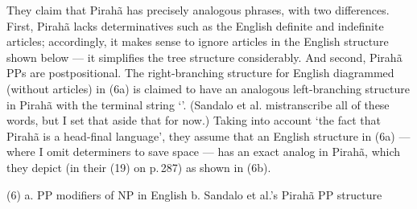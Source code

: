 \documentclass[output=paper,colorlinks,citecolor=brown
]{langscibook}
\begin{document}
They claim that Pirah{\~a} has precisely analogous phrases, with two
differences. First, Pirah{\~a} lacks determinatives such as the English
definite and indefinite articles; accordingly, it makes sense to ignore
articles in the English structure shown below --- it simplifies the tree
structure considerably.  And second, Pirah{\~a} PPs are postpositional.
The right-branching structure for English diagrammed (without articles)
in (6a) is claimed to have an analogous left-branching structure in
Pirah{\~a} with the terminal string `'. (Sandalo et al. mistranscribe all of these
words, but I set that aside that for now.) Taking into account `the
fact that Pirah{\~a} is a head-final language', they assume that an
English structure in (6a) --- where I omit determiners to save space
--- has an exact analog in Pirah{\~a}, which they depict
(in their (19) on p.\,287) as shown in (6b).

\noindent
(6) a. PP modifiers of NP in English\hspace*{3ex}
    b. Sandalo et al.'s Pirah{\~a} PP structure

\nopagebreak[4]
\end{document}
